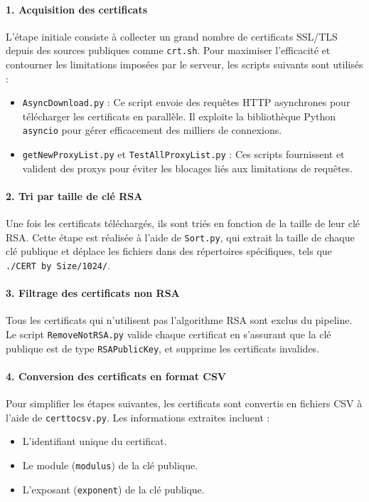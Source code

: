 \documentclass[11pt,a4paper]{article}
\begin{document}
\paragraph{1. Acquisition des certificats}
L'étape initiale consiste à collecter un grand nombre de certificats SSL/TLS depuis des sources publiques comme \texttt{crt.sh}. Pour maximiser l'efficacité et contourner les limitations imposées par le serveur, les scripts suivants sont utilisés :
\begin{itemize}
    \item \texttt{AsyncDownload.py} : Ce script envoie des requêtes HTTP asynchrones pour télécharger les certificats en parallèle. Il exploite la bibliothèque Python \texttt{asyncio} pour gérer efficacement des milliers de connexions.
    \item \texttt{getNewProxyList.py} et \texttt{TestAllProxyList.py} : Ces scripts fournissent et valident des proxys pour éviter les blocages liés aux limitations de requêtes.
\end{itemize}

\paragraph{2. Tri par taille de clé RSA}
Une fois les certificats téléchargés, ils sont triés en fonction de la taille de leur clé RSA. Cette étape est réalisée à l'aide de \texttt{Sort.py}, qui extrait la taille de chaque clé publique et déplace les fichiers dans des répertoires spécifiques, tels que \texttt{./CERT by Size/1024/}.

\paragraph{3. Filtrage des certificats non RSA}
Tous les certificats qui n'utilisent pas l'algorithme RSA sont exclus du pipeline. Le script \texttt{RemoveNotRSA.py} valide chaque certificat en s'assurant que la clé publique est de type \texttt{RSAPublicKey}, et supprime les certificats invalides.

\paragraph{4. Conversion des certificats en format CSV}
Pour simplifier les étapes suivantes, les certificats sont convertis en fichiers CSV à l'aide de \texttt{certtocsv.py}. Les informations extraites incluent :
\begin{itemize}
    \item L'identifiant unique du certificat.
    \item Le module (\texttt{modulus}) de la clé publique.
    \item L'exposant (\texttt{exponent}) de la clé publique.
\end{itemize}
\end{document}
